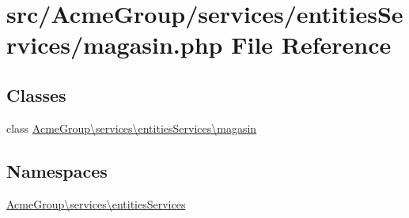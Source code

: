 \hypertarget{services_2entities_services_2magasin_8php}{\section{src/\+Acme\+Group/services/entities\+Services/magasin.php File Reference}
\label{services_2entities_services_2magasin_8php}
}
\subsection*{Classes}
\begin{DoxyCompactItemize}
\item 
class \hyperlink{class_acme_group_1_1services_1_1entities_services_1_1magasin}{Acme\+Group\textbackslash{}services\textbackslash{}entities\+Services\textbackslash{}magasin}
\end{DoxyCompactItemize}
\subsection*{Namespaces}
\begin{DoxyCompactItemize}
\item 
 \hyperlink{namespace_acme_group_1_1services_1_1entities_services}{Acme\+Group\textbackslash{}services\textbackslash{}entities\+Services}
\end{DoxyCompactItemize}
